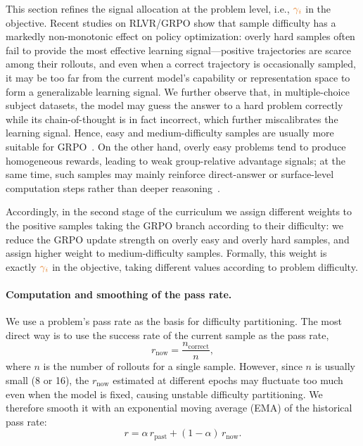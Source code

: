 \documentclass{article}
\begin{document}
This section refines the signal allocation at the problem level, i.e., ${\color{cGamma}\gamma_i}$ in the objective. Recent studies on RLVR/GRPO show that sample difficulty has a markedly non-monotonic effect on policy optimization: overly hard samples often fail to provide the most effective learning signal---positive trajectories are scarce among their rollouts, and even when a correct trajectory is occasionally sampled, it may be too far from the current model's capability or representation space to form a generalizable learning signal. We further observe that, in multiple-choice subject datasets, the model may guess the answer to a hard problem correctly while its chain-of-thought is in fact incorrect, which further miscalibrates the learning signal. Hence, easy and medium-difficulty samples are usually more suitable for GRPO~\citep{cheng2026sampledifficulty,baroian2026prompt}. On the other hand, overly easy problems tend to produce homogeneous rewards, leading to weak group-relative advantage signals; at the same time, such samples may mainly reinforce direct-answer or surface-level computation steps rather than deeper reasoning~\citep{chen2026unlearnability,cheng2026sampledifficulty}.

Accordingly, in the second stage of the curriculum we assign different weights to the positive samples taking the GRPO branch according to their difficulty: we reduce the GRPO update strength on overly easy and overly hard samples, and assign higher weight to medium-difficulty samples. Formally, this weight is exactly ${\color{cGamma}\gamma_i}$ in the objective, taking different values according to problem difficulty.

\paragraph{Computation and smoothing of the pass rate.}
We use a problem's pass rate as the basis for difficulty partitioning. The most direct way is to use the success rate of the current sample as the pass rate,
\begin{equation}
r_{\mathrm{now}} = \frac{n_{\mathrm{correct}}}{n},
\end{equation}
where $n$ is the number of rollouts for a single sample. However, since $n$ is usually small (8 or 16), the $r_{\mathrm{now}}$ estimated at different epochs may fluctuate too much even when the model is fixed, causing unstable difficulty partitioning. We therefore smooth it with an exponential moving average (EMA) of the historical pass rate:
\begin{equation}
r = \alpha\, r_{\mathrm{past}} + (1-\alpha)\, r_{\mathrm{now}}.
\end{equation}
\end{document}
